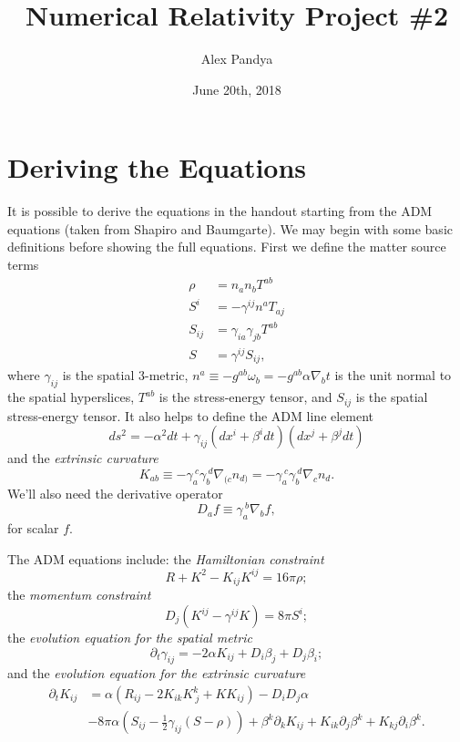 \documentclass[12pt]{article}
\numberwithin{equation}{section}
\begin{document}
	\title{Numerical Relativity Project \#2}
	\author{Alex Pandya}
	\date{June 20th, 2018}
	\maketitle

\section{Deriving the Equations}
It is possible to derive the equations in the handout starting from the ADM equations (taken from Shapiro and Baumgarte).  We may begin with some basic definitions before showing the full equations.  First we define the matter source terms
\begin{align}
\rho &= n_a n_b T^{ab} \\
S^i &= -\gamma^{ij} n^a T_{aj} \\
S_{ij} &= \gamma_{ia} \gamma_{jb} T^{ab} \\
S &= \gamma^{ij} S_{ij},
\end{align}
where $\gamma_{ij}$ is the spatial 3-metric, $n^a \equiv - g^{ab} \omega_b = -g^{ab} \alpha \nabla_b t$ is the unit normal to the spatial hyperslices, $T^{ab}$ is the stress-energy tensor, and $S_{ij}$ is the spatial stress-energy tensor.  It also helps to define the ADM line element
\begin{equation} \label{eq:ADM_line_element}
ds^2 = -\alpha^2 dt + \gamma_{ij} (dx^i + \beta^i dt) (dx^j + \beta^j dt)
\end{equation}
and the \textit{extrinsic curvature}
\begin{equation}
K_{ab} \equiv - \gamma_a^{~c} \gamma_b^{~d} \nabla_{(c} n_{d)} = - \gamma_a^{~c} \gamma_b^{~d} \nabla_c n_d.
\end{equation}
We'll also need the derivative operator
\begin{equation}
D_a f \equiv \gamma_{a}^{~b} \nabla_b f,
\end{equation}
for scalar $f$.

The ADM equations include: the \textit{Hamiltonian constraint}
\begin{equation}
R + K^2 - K_{ij} K^{ij} = 16 \pi \rho;
\end{equation}
the \textit{momentum constraint}
\begin{equation}
D_j (K^{ij} - \gamma^{ij} K) = 8 \pi S^{i};
\end{equation}
the \textit{evolution equation for the spatial metric}
\begin{equation} \label{eq:spatial_metric_evol}
\partial_t \gamma_{ij} = -2 \alpha K_{ij} + D_i \beta_j + D_j \beta_i;
\end{equation}
and the \textit{evolution equation for the extrinsic curvature}
\begin{equation}
\begin{aligned}
\partial_t K_{ij} &= \alpha (R_{ij} - 2 K_{ik} K^{k}_{~j} + K K_{ij}) - D_i D_j \alpha \\
&- 8 \pi \alpha (S_{ij} - \frac{1}{2} \gamma_{ij} (S - \rho)) + \beta^k \partial_k K_{ij} + K_{ik} \partial_j \beta^k + K_{kj} \partial_i \beta^k.
\end{aligned}
\end{equation}
\end{document}
